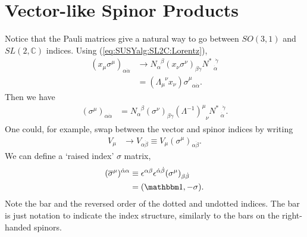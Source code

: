 \documentclass[12pt]{article}
\numberwithin{equation}{section}    %
\begin{document}
\section{Vector-like Spinor Products}

Notice that the Pauli matrices give a natural way to go between $SO(3,1)$ and $SL(2,\mathbb C)$ indices. Using  (\ref{eq:SUSYalg:SL2C:Lorentz}),
\begin{align}
	(x_\mu\sigma^\mu)_{\alpha\dot\alpha} &\rightarrow N_\alpha^{\phantom\alpha\beta}(x_\nu\sigma^\nu)_{\beta\dot\gamma}N^{*\phantom{\dot\alpha}\dot\gamma}_{\phantom *\dot\alpha}\\
	&= (\Lambda_\mu^{\phantom\mu\nu}x_\nu)\sigma^\mu_{\phantom\mu\alpha\dot\alpha}.
\end{align}
Then we have
\begin{align}
	(\sigma^\mu)_{\alpha\dot\alpha} &= N_\alpha^{\phantom\alpha\beta}(\sigma^\nu)_{\beta\dot\gamma}(\Lambda^{-1})^\mu_{\phantom\mu\nu}N^{*\phantom{\dot\alpha}\dot\gamma}_{\phantom*\dot\alpha}.
\end{align}
One could, for example, swap between the vector and spinor indices by writing
\begin{align}
	V_\mu & \rightarrow V_{\alpha\dot\beta} \equiv V_\mu (\sigma^\mu)_{\alpha\dot\beta}.\label{eq:SUSYalg:vecspinor}
\end{align} 
We can define a `raised index' $\sigma$ matrix,
\begin{align}
	(\overline\sigma^\mu)^{\dot\alpha\alpha} &\equiv \epsilon^{\alpha\beta}\epsilon^{\dot\alpha\dot\beta}(\sigma^\mu)_{\beta\dot\beta}\label{eq:SUSYalg:sigmamu}\\
	&= (\mathbbm 1, -{\mathbf{\sigma}}).\label{eq:SUSYalg:sigma-bar}
\end{align}
Note the bar and the reversed order of the dotted and undotted indices. The bar is just notation to indicate the index structure, similarly to the bars on the right-handed spinors. 
\end{document}

